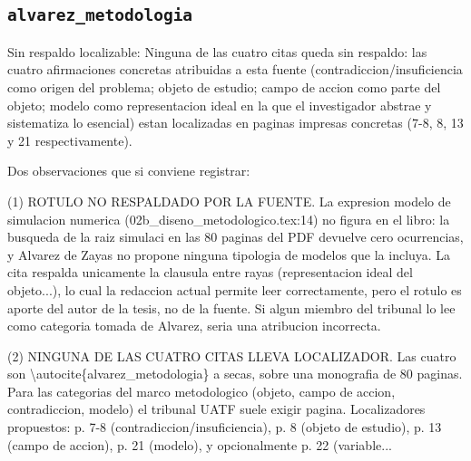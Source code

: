 \documentclass[11pt,a4paper]{article}
\newcommand{\campo}[1]{\textcolor{gris}{\footnotesize #1}}
\begin{document}
\subsection{\texttt{alvarez\_metodologia}}
{\small\campo{Sin respaldo localizable:} Ninguna de las cuatro citas queda sin respaldo: las cuatro afirmaciones concretas atribuidas a esta fuente (contradiccion/insuficiencia como origen del problema; objeto de estudio; campo de accion como parte del objeto; modelo como representacion ideal en la que el investigador abstrae y sistematiza lo esencial) estan localizadas en paginas impresas concretas (7-8, 8, 13 y 21 respectivamente).

Dos observaciones que si conviene registrar:

(1) ROTULO NO RESPALDADO POR LA FUENTE. La expresion \textquotedbl{}modelo de simulacion numerica\textquotedbl{} (02b\_diseno\_metodologico.tex:14) no figura en el libro: la busqueda de la raiz \textquotedbl{}simulaci\textquotedbl{} en las 80 paginas del PDF devuelve cero ocurrencias, y Alvarez de Zayas no propone ninguna tipologia de modelos que la incluya. La cita respalda unicamente la clausula entre rayas (\textquotedbl{}representacion ideal del objeto...\textquotedbl{}), lo cual la redaccion actual permite leer correctamente, pero el rotulo es aporte del autor de la tesis, no de la fuente. Si algun miembro del tribunal lo lee como categoria tomada de Alvarez, seria una atribucion incorrecta.

(2) NINGUNA DE LAS CUATRO CITAS LLEVA LOCALIZADOR. Las cuatro son \textbackslash{}autocite\{alvarez\_metodologia\} a secas, sobre una monografia de 80 paginas. Para las categorias del marco metodologico (objeto, campo de accion, contradiccion, modelo) el tribunal UATF suele exigir pagina. Localizadores propuestos: p. 7-8 (contradiccion/insuficiencia), p. 8 (objeto de estudio), p. 13 (campo de accion), p. 21 (modelo), y opcionalmente p. 22 (variable...\par}
\end{document}
